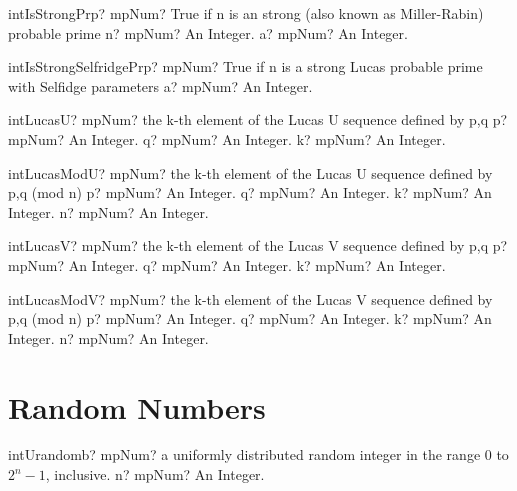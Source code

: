 \documentclass[12pt,a4paper,openany]{book}
\begin{document}
\begin{mpFunctionsExtract}
\mpFunctionTwo
{intIsStrongPrp? mpNum? True if n is an strong (also known as Miller-Rabin) probable prime}
{n? mpNum? An Integer.}
{a? mpNum? An Integer.}
\end{mpFunctionsExtract}

\begin{mpFunctionsExtract}
\mpFunctionOne
{intIsStrongSelfridgePrp? mpNum? True if n is a strong Lucas probable prime with Selfidge parameters}
{a? mpNum? An Integer.}
\end{mpFunctionsExtract}

\begin{mpFunctionsExtract}
\mpFunctionThree
{intLucasU? mpNum? the k-th element of the Lucas U sequence defined by p,q}
{p? mpNum? An Integer.}
{q? mpNum? An Integer.}
{k? mpNum? An Integer.}
\end{mpFunctionsExtract}

\begin{mpFunctionsExtract}
\mpFunctionFour
{intLucasModU? mpNum? the k-th element of the Lucas U sequence defined by p,q (mod n)}
{p? mpNum? An Integer.}
{q? mpNum? An Integer.}
{k? mpNum? An Integer.}
{n? mpNum? An Integer.}
\end{mpFunctionsExtract}

\begin{mpFunctionsExtract}
\mpFunctionThree
{intLucasV? mpNum? the k-th element of the Lucas V sequence defined by p,q}
{p? mpNum? An Integer.}
{q? mpNum? An Integer.}
{k? mpNum? An Integer.}
\end{mpFunctionsExtract}

\begin{mpFunctionsExtract}
\mpFunctionFour
{intLucasModV? mpNum? the k-th element of the Lucas V sequence defined by p,q (mod n)}
{p? mpNum? An Integer.}
{q? mpNum? An Integer.}
{k? mpNum? An Integer.}
{n? mpNum? An Integer.}
\end{mpFunctionsExtract}

\section{Random Numbers}

\begin{mpFunctionsExtract}
\mpFunctionOne
{intUrandomb? mpNum? a uniformly distributed random integer in the range 0 to $2^n - 1$, inclusive.}
{n? mpNum? An Integer.}
\end{mpFunctionsExtract}
\end{document}
